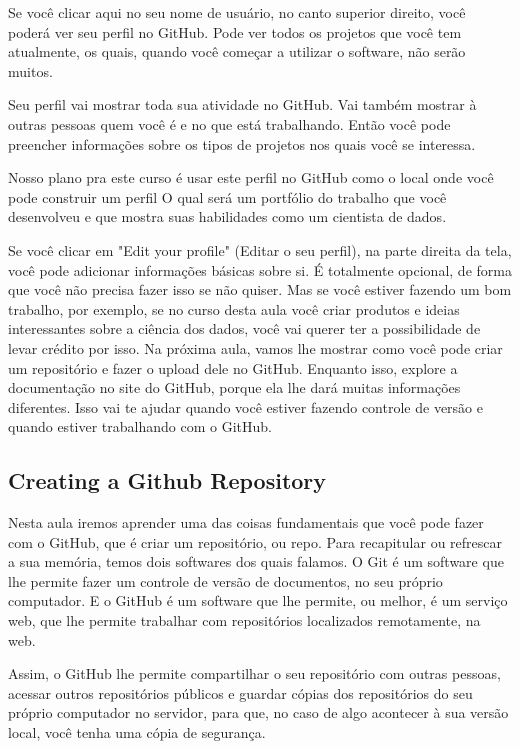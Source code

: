 Se você clicar aqui no seu nome de usuário, no canto superior direito, você poderá ver seu perfil no GitHub. Pode ver todos os projetos que você tem atualmente, os quais, quando você começar a utilizar o software, não serão muitos. 

Seu perfil vai mostrar toda sua atividade no GitHub. Vai também mostrar à outras pessoas quem você é e no que está trabalhando. Então você pode preencher informações sobre os tipos de projetos nos quais você se interessa. 

Nosso plano pra este curso é usar este perfil no GitHub como o local onde você pode construir um perfil O qual será um portfólio do trabalho que você desenvolveu e que mostra suas habilidades como um cientista de dados. 

Se você clicar em "Edit your profile" (Editar o seu perfil), na parte direita da tela,  você pode adicionar informações básicas sobre si. É totalmente opcional, de forma que você não precisa fazer isso se não quiser. Mas se você estiver fazendo um bom trabalho, por exemplo,  se no curso desta aula você criar produtos e ideias interessantes sobre a ciência dos dados, você vai querer ter a possibilidade de levar crédito por isso. Na próxima aula, vamos lhe mostrar como você pode criar um repositório e fazer o upload dele no GitHub. Enquanto isso, explore a documentação no site do GitHub, porque ela lhe dará muitas informações diferentes. Isso vai te ajudar quando você estiver fazendo controle de versão e quando estiver trabalhando com o GitHub. 


\subsection{Creating a Github Repository}

Nesta aula iremos aprender uma das coisas fundamentais que você pode fazer com o GitHub, que é criar um repositório, ou repo. Para recapitular ou refrescar a sua memória, temos dois softwares dos quais falamos. O Git é um software que lhe permite fazer um controle de versão de documentos, no seu próprio computador. E o GitHub é um software que lhe permite, ou melhor, é um serviço web, que lhe permite trabalhar com repositórios localizados remotamente, na web. 

Assim, o GitHub lhe permite compartilhar o seu repositório com outras pessoas, acessar outros repositórios públicos e guardar cópias dos repositórios do seu próprio computador no servidor, para que, no caso de algo acontecer à sua versão local, você tenha uma cópia de segurança. 


